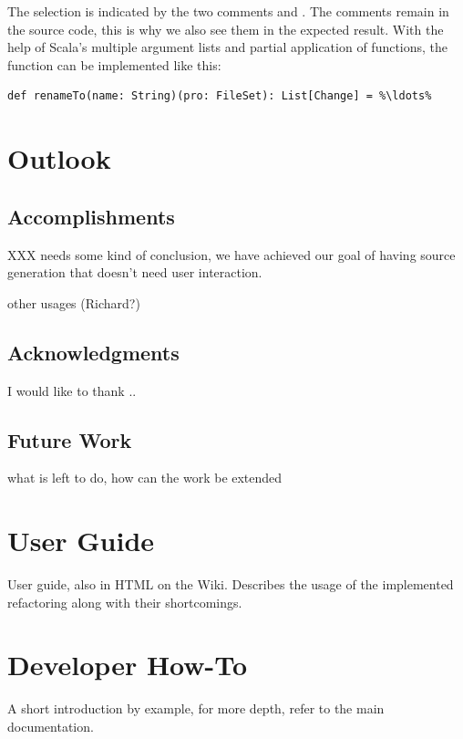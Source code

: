 \documentclass[10pt,a4paper,oneside]{scrreprt}
\begin{document}
The selection is indicated by the two comments \src{/*(*/} and \src{/*)*/}. The comments remain in the source code, this is why we also see them in the expected result. With the help of Scala's multiple argument lists and partial application of functions, the  function can be implemented like this:

\begin{lstlisting}
def renameTo(name: String)(pro: FileSet): List[Change] = %\ldots%
\end{lstlisting}


\chapter{Outlook} \label{chapter:outlook}

\section{Accomplishments}

XXX needs some kind of conclusion, we have achieved our goal of having source generation that doesn't need user interaction.

other usages (Richard?)


\section{Acknowledgments}

I would like to thank ..

\section{Future Work}

what is left to do, how can the work be extended

\appendix

\chapter{User Guide} \label{chapter:user-guide}

User guide, also in HTML on the Wiki. Describes the usage of the implemented refactoring along with their shortcomings.

\chapter{Developer How-To} \label{chapter:developer-how-to}

A short introduction by example, for more depth, refer to the main documentation.





\clearpage
\bib
\end{document}
